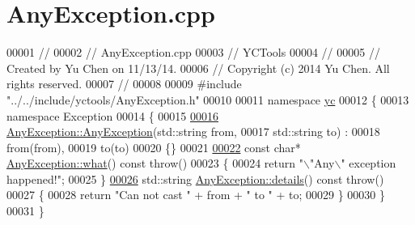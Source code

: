 \hypertarget{_any_exception_8cpp_source}{}\section{Any\+Exception.\+cpp}
\label{_any_exception_8cpp_source}

\begin{DoxyCode}
00001 \textcolor{comment}{//}
00002 \textcolor{comment}{//  AnyException.cpp}
00003 \textcolor{comment}{//  YCTools}
00004 \textcolor{comment}{//}
00005 \textcolor{comment}{//  Created by Yu Chen on 11/13/14.}
00006 \textcolor{comment}{//  Copyright (c) 2014 Yu Chen. All rights reserved.}
00007 \textcolor{comment}{//}
00008 
00009 \textcolor{preprocessor}{#include "../../include/yctools/AnyException.h"}
00010 
00011 \textcolor{keyword}{namespace }\hyperlink{namespaceyc}{yc}
00012 \{
00013     \textcolor{keyword}{namespace }Exception
00014     \{
00015         
\hypertarget{_any_exception_8cpp_source_l00016}{}\hyperlink{classyc_1_1_exception_1_1_any_exception_abda851a91ea23881a962fe03aa8cdade}{00016}         \hyperlink{classyc_1_1_exception_1_1_any_exception_abda851a91ea23881a962fe03aa8cdade}{AnyException::AnyException}(std::string from,
00017                                    std::string to) :
00018             from(from),
00019             to(to)
00020         \{\}
00021         
\hypertarget{_any_exception_8cpp_source_l00022}{}\hyperlink{classyc_1_1_exception_1_1_any_exception_adb9ee72fffdead0be22d0e919528c73c}{00022}         \textcolor{keyword}{const} \textcolor{keywordtype}{char}* \hyperlink{classyc_1_1_exception_1_1_any_exception_adb9ee72fffdead0be22d0e919528c73c}{AnyException::what}() \textcolor{keyword}{const} throw()
00023         \{
00024             \textcolor{keywordflow}{return} \textcolor{stringliteral}{"\(\backslash\)"Any\(\backslash\)" exception happened!"};
00025         \}
\hypertarget{_any_exception_8cpp_source_l00026}{}\hyperlink{classyc_1_1_exception_1_1_any_exception_adad22f07ba9d119cd168758fa85d4020}{00026}         std::string \hyperlink{classyc_1_1_exception_1_1_any_exception_adad22f07ba9d119cd168758fa85d4020}{AnyException::details}() \textcolor{keyword}{const} throw()
00027         \{
00028             \textcolor{keywordflow}{return} \textcolor{stringliteral}{"Can not cast "} + from + \textcolor{stringliteral}{" to "} + to;
00029         \}
00030     \}
00031 \}
\end{DoxyCode}
